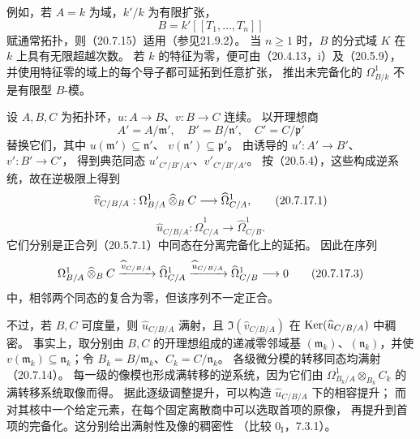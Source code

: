 例如，若 $A=k$ 为域，$k'/k$ 为有限扩张，
\[
 B=k'[[T_1,\ldots,T_n]]
\]
赋通常拓扑，则（20.7.15）适用（参见21.9.2）。
当 $n\ge1$ 时，$B$ 的分式域 $K$ 在 $k$ 上具有无限超越次数。
若 $k$ 的特征为零，便可由（20.4.13，i）及（20.5.9），
并使用特征零的域上的每个导子都可延拓到任意扩张，
推出未完备化的 $\Omega^1_{B/k}$ 不是有限型 $B$-模。

设 $A,B,C$ 为拓扑环，$u:A\to B$、$v:B\to C$ 连续。
以开理想商
\[
 A'=A/\mathfrak m',\quad B'=B/\mathfrak n',\quad C'=C/\mathfrak p'
\]
替换它们，其中
$u(\mathfrak m')\subseteq\mathfrak n'$、
$v(\mathfrak n')\subseteq\mathfrak p'$。
由诱导的 $u':A'\to B'$、$v':B'\to C'$，
得到典范同态 $u'_{C'/B'/A'}$、$v'_{C'/B'/A'}$。
按（20.5.4），这些构成逆系统，故在逆极限上得到
\begin{equation}
 \widehat v_{C/B/A}:
 \Omega^1_{B/A}\mathbin{\widehat{\otimes}}_B C\longrightarrow\widehat{\Omega}^1_{C/A},
 \tag{20.7.17.1}
\end{equation}
\begin{equation}
 \widehat u_{C/B/A}:
 \widehat{\Omega}^1_{C/A}\longrightarrow\widehat{\Omega}^1_{C/B}.
 \tag{20.7.17.2}
\end{equation}
它们分别是正合列（20.5.7.1）中同态在分离完备化上的延拓。
因此在序列
\begin{equation}
 \Omega^1_{B/A}\mathbin{\widehat{\otimes}}_B C
 \xrightarrow{\widehat v_{C/B/A}}\widehat{\Omega}^1_{C/A}
 \xrightarrow{\widehat u_{C/B/A}}\widehat{\Omega}^1_{C/B}
 \longrightarrow0
 \tag{20.7.17.3}
\end{equation}
中，相邻两个同态的复合为零，但该序列不一定正合。

不过，若 $B,C$ 可度量，则 $\widehat u_{C/B/A}$ 满射，且
$\Im(\widehat v_{C/B/A})$ 在 $\operatorname{Ker}(\widehat u_{C/B/A})$ 中稠密。
事实上，取分别由 $B,C$ 的开理想组成的递减零邻域基
$(\mathfrak m_k)$、$(\mathfrak n_k)$，并使
$v(\mathfrak m_k)\subseteq\mathfrak n_k$；令
$B_k=B/\mathfrak m_k$、$C_k=C/\mathfrak n_k$。
各级微分模的转移同态均满射（20.7.14）。
每一级的像模也形成满转移的逆系统，因为它们由
$\Omega^1_{B_k/A}\otimes_{B_k}C_k$ 的满转移系统取像而得。
据此逐级调整提升，可以构造 $\widehat u_{C/B/A}$ 下的相容提升；
而对其核中一个给定元素，在每个固定离散商中可以选取首项的原像，
再提升到首项的完备化。这分别给出满射性及像的稠密性
（比较 $0_{\mathrm I}$，7.3.1）。

